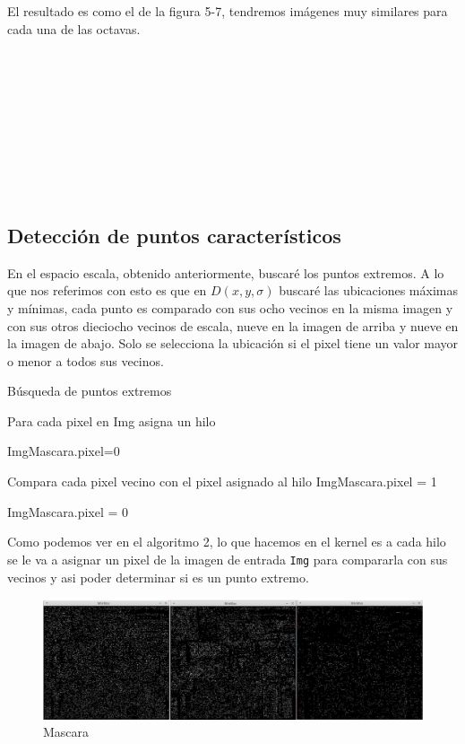 El resultado es como el de la figura 5-7, tendremos imágenes muy similares para cada una de las octavas. 
\\\\\\\\\\\\\\\\\\\\


\subsection{Detección de puntos característicos}
En el espacio escala, obtenido anteriormente, buscaré los puntos extremos. A lo que nos referimos con esto es que en $D(x,y,\sigma)$ buscaré las ubicaciones máximas y mínimas, cada punto es comparado con sus ocho vecinos en la misma imagen y con sus otros dieciocho vecinos de escala, nueve en la imagen de arriba y nueve en la imagen de abajo. Solo se selecciona la ubicación si el pixel tiene un valor mayor o menor a todos sus vecinos.\\


\begin{algorithm}[H]
\caption{Búsqueda de puntos extremos}
 Para cada pixel en Img asigna un hilo\;
 
 {
	{
		ImgMascara.pixel=0\;
	}{
		{
			Compara cada pixel vecino con el pixel asignado al hilo\;
			{
				ImgMascara.pixel = 1\;			
			}{
				ImgMascara.pixel = 0\;
			
			}
		
		}
		
	}
 }
	
\end{algorithm}


Como podemos ver en el algoritmo 2, lo que hacemos en el kernel es a cada hilo se le va a asignar un pixel de la imagen de entrada \texttt{Img} para compararla con sus vecinos y asi poder determinar si es un punto extremo.\\ \pagebreak
 
\begin{figure}[h]
			\centering
				\includegraphics[scale=0.3]{img/minmaxs.jpg}
			\caption{Mascara}
\end{figure} 
 
